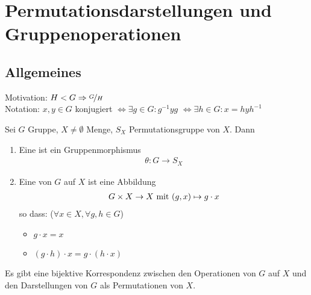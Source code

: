 ﻿\section{Permutationsdarstellungen und Gruppenoperationen}
\subsection*{Allgemeines}
Motivation: $H < G \implies \lnkset{G}{H}$\\
Notation: $x,y \in G$ konjugiert $\Leftrightarrow \exists g \in G \colon g^{-1}yg$ $\Leftrightarrow \exists h \in G\colon x = hyh^{-1}$
\begin{definition}
	Sei $G$ Gruppe, $X \neq \emptyset$ Menge, $S_X$ Permutationsgruppe von $X$. Dann
	\begin{enumerate}
		\item Eine  ist ein Gruppenmorphismus
		\begin{align*}
			\theta\colon G \to S_X
		\end{align*}
		\item Eine  von $G$ auf $X$ ist eine Abbildung
		\begin{align*}
			G\times X \to X \mit (g,x) \mapsto g\cdot x
		\end{align*}
		so dass: ($\forall x \in X, \forall g,h \in G$)
		\begin{itemize}
			\item $g \cdot x = x$
			\item $(g\cdot h)\cdot x = g \cdot (h\cdot x)$
		\end{itemize}
	\end{enumerate}
\end{definition}
\begin{proposition}
	Es gibt eine bijektive Korrespondenz zwischen den Operationen von $G$ auf $X$ und den Darstellungen von $G$ als Permutationen von $X$.
\end{proposition}
